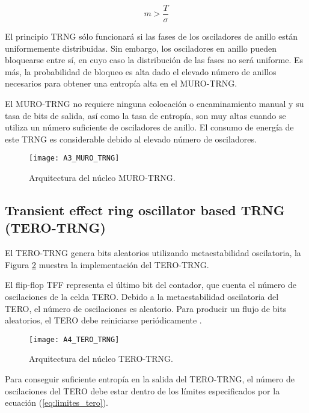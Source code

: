 			    \begin{equation}
			     m > \frac{T}{\sigma} 
			     \label{eq:muro_condicion}
			    \end{equation}	

            El principio TRNG sólo funcionará si las fases de los osciladores de anillo están uniformemente distribuidas. Sin embargo, los osciladores en anillo pueden bloquearse entre sí, en cuyo caso la distribución de las fases no será uniforme. Es más, la probabilidad de bloqueo es alta dado el elevado número de anillos necesarios para obtener una entropía alta en el MURO-TRNG.

            El MURO-TRNG no requiere ninguna colocación o encaminamiento manual y su tasa de bits de salida, así como la tasa de entropía, son muy altas cuando se utiliza un número suficiente de osciladores de anillo. El consumo de energía de este TRNG es considerable debido al elevado número de osciladores.
				
				\begin{figure}[hbtp]
					\centering
					\texttt{[image: A3\_MURO\_TRNG]}
					\caption{Arquitectura del núcleo MURO-TRNG.}
					\label{fig:A3_MURO_TRNG}
				\end{figure}


		\subsection{Transient effect ring oscillator based TRNG (TERO-TRNG)}

            El TERO-TRNG genera bits aleatorios utilizando metaestabilidad oscilatoria, la Figura \ref{fig:A4_TERO_TRNG} muestra la implementación del TERO-TRNG.

            El flip-flop TFF representa el último bit del contador, que cuenta el número de oscilaciones de la celda TERO. Debido a la metaestabilidad oscilatoria del TERO, el número de oscilaciones es aleatorio. Para producir un flujo de bits aleatorios, el TERO debe reiniciarse periódicamente \cite{Haddad2015}.
	
            \begin{figure}[hbtp]
                \centering
                \texttt{[image: A4\_TERO\_TRNG]}
                \caption{Arquitectura del núcleo TERO-TRNG.}
                \label{fig:A4_TERO_TRNG}
            \end{figure}

            Para conseguir suficiente entropía en la salida del TERO-TRNG, el número de oscilaciones del TERO debe estar dentro de los límites especificados por la ecuación (\ref{eq:limites_tero}).

